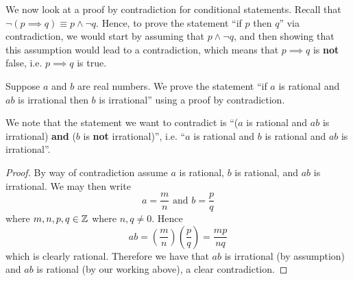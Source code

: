 We now look at a proof by contradiction for conditional statements. Recall that $\lnot(p \implies q) \equiv p \land \lnot q$. Hence, to prove the statement ``if $p$ then $q$'' via contradiction, we would start by assuming that $p \land \lnot q$, and then showing that this assumption would lead to a contradiction, which means that $p \implies q$ is \textbf{not} false, i.e. $p \implies q$ is true.

\begin{example}
    \setlength{\parindent}{1.5em}

    Suppose $a$ and $b$ are real numbers. We prove the statement ``if $a$ is rational and $ab$ is irrational then $b$ is irrational'' using a proof by contradiction.

    We note that the statement we want to contradict is ``($a$ is rational and $ab$ is irrational) \textbf{and} ($b$ is \textbf{not} irrational)'', i.e. ``$a$ is rational and $b$ is rational and $ab$ is irrational''.
    \begin{proof}
        By way of contradiction assume $a$ is rational, $b$ is rational, and $ab$ is irrational. We may then write
        \[
            a = \frac mn \text{ and } b = \frac pq
        \]
        where $m, n, p, q \in \mathbb{Z}$ where $n, q \neq 0$. Hence
        \[
            ab = \left(\frac mn\right)\left(\frac pq\right) = \frac{mp}{nq}
        \]
        which is clearly rational. Therefore we have that $ab$ is irrational (by assumption) and $ab$ is rational (by our working above), a clear contradiction.
    \end{proof}
\end{example}

